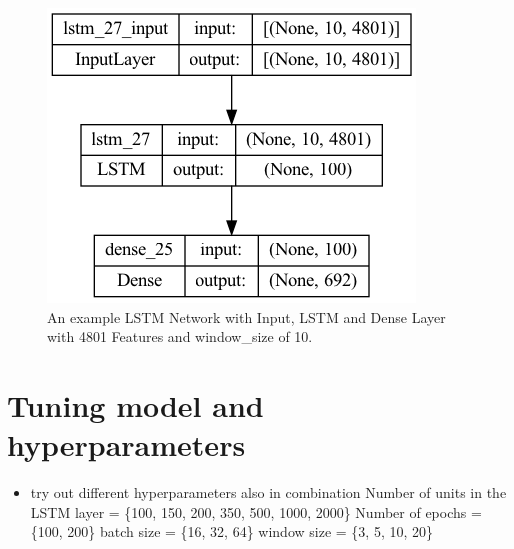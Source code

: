 \begin{figure}[h!]
    \centering
    \includegraphics[scale=0.5]{images/model_plot.png}
    \caption{An example LSTM Network with Input, LSTM and Dense Layer with 4801 Features and window\_size of 10.}
    \label{fig:lstm_architecture}
\end{figure}

\section{Tuning model and hyperparameters}
\begin{itemize}
    \item try out different hyperparameters also in combination
    \subitem Number of units in the LSTM layer = \{100, 150, 200, 350, 500, 1000, 2000\}
    \subitem Number of epochs = \{100, 200\}
    \subitem batch size = \{16, 32, 64\}
    \subitem window size = \{3, 5, 10, 20\}
\end{itemize}

